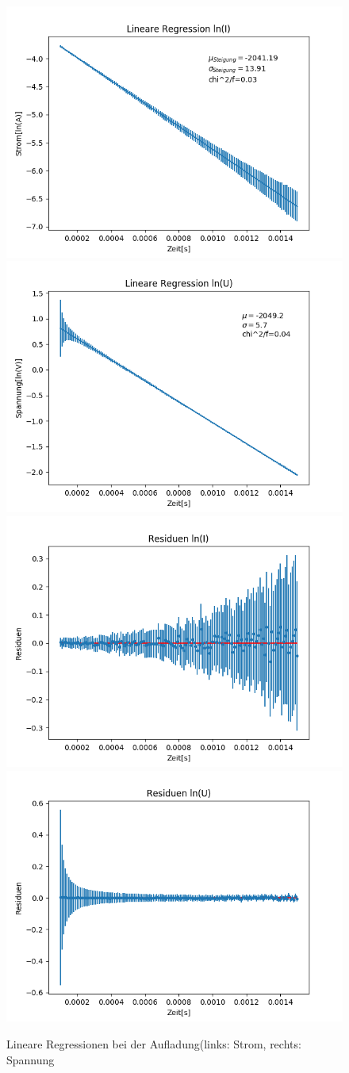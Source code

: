 \documentclass[12pt,a4paper]{article}
\begin{document}
\begin{figure}
\begin{center}
\includegraphics[width=0.49\linewidth]{Bilder/Kondensator_auf_linI}
\includegraphics[width=0.49\linewidth]{Bilder/Kondensator_auf_linU}
\includegraphics[width=0.49\linewidth]{Bilder/Kondensator_auf_resI}
\includegraphics[width=0.49\linewidth]{Bilder/Kondensator_auf_resU}
\caption[Rohdaten logarith. A]{Lineare Regressionen bei der Aufladung(links: Strom, rechts: Spannung}
\label{fig:linAuf}
\end{center}
\end{figure}
\end{document}
